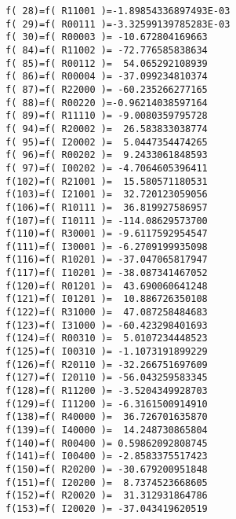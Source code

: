 \begin{footnotesize}
\begin{verbatim}
f( 28)=f( R11001 )=-1.89854336897493E-03
f( 29)=f( R00111 )=-3.32599139785283E-03
f( 30)=f( R00003 )= -10.672804169663
f( 84)=f( R11002 )= -72.776585838634
f( 85)=f( R00112 )=  54.065292108939
f( 86)=f( R00004 )= -37.099234810374
f( 87)=f( R22000 )= -60.235266277165
f( 88)=f( R00220 )=-0.96214038597164
f( 89)=f( R11110 )= -9.0080359795728
f( 94)=f( R20002 )=  26.583833038774
f( 95)=f( I20002 )=  5.0447354474265
f( 96)=f( R00202 )=  9.2433061848593
f( 97)=f( I00202 )= -4.7064605396411
f(102)=f( R21001 )=  15.580571180531
f(103)=f( I21001 )=  32.720123059056
f(106)=f( R10111 )=  36.819927586957
f(107)=f( I10111 )= -114.08629573700
f(110)=f( R30001 )= -9.6117592954547
f(111)=f( I30001 )= -6.2709199935098
f(116)=f( R10201 )= -37.047065817947
f(117)=f( I10201 )= -38.087341467052
f(120)=f( R01201 )=  43.690060641248
f(121)=f( I01201 )=  10.886726350108
f(122)=f( R31000 )=  47.087258484683
f(123)=f( I31000 )= -60.423298401693
f(124)=f( R00310 )=  5.0107234448523
f(125)=f( I00310 )= -1.1073191899229
f(126)=f( R20110 )= -32.266751697609
f(127)=f( I20110 )= -56.043259583345
f(128)=f( R11200 )= -3.5204349928703
f(129)=f( I11200 )= -6.3161500914910
f(138)=f( R40000 )=  36.726701635870
f(139)=f( I40000 )=  14.248730865804
f(140)=f( R00400 )= 0.59862092808745
f(141)=f( I00400 )= -2.8583375517423
f(150)=f( R20200 )= -30.679200951848
f(151)=f( I20200 )=  8.7374523668605
f(152)=f( R20020 )=  31.312931864786
f(153)=f( I20020 )= -37.043419620519

\end{verbatim}
\end{footnotesize}

\newpage

